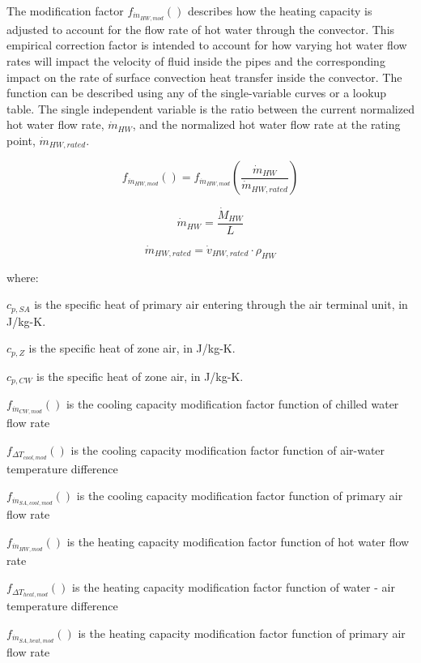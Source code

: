 The modification factor \(f_{\dot m_{HW,mod}}()\) describes how the heating capacity is adjusted to account for the flow rate of hot water through the convector. This empirical correction factor is intended to account for how varying hot water flow rates will impact the velocity of fluid inside the pipes and the corresponding impact on the rate of surface convection heat transfer inside the convector. The function can be described using any of the single-variable curves or a lookup table. The single independent variable is the ratio between the current normalized hot water flow rate, \({\dot m_{HW}}\), and the normalized hot water flow rate at the rating point, \({\dot m_{HW,rated}}\).

\begin{equation}
  f_{\dot m_{HW,mod}}() = f_{\dot m_{HW,mod}}\left(\frac{{\dot m_{HW}}}{{\dot m_{HW,rated}}}\right)
\end{equation}

\begin{equation}
  {\dot m_{HW}} = \frac{\dot M_{HW}}{L}
\end{equation}

\begin{equation}
  {\dot m_{HW,rated}} = {\dot v_{HW,rated}} \cdot {\rho_{HW}}
\end{equation}

where:

\({c_{p,SA}}\) is the specific heat of primary air entering through the air terminal unit, in J/kg-K.

\({c_{p,Z}}\) is the specific heat of zone air, in J/kg-K.

\({c_{p,CW}}\) is the specific heat of zone air, in J/kg-K.

\({f_{\dot m_{CW,mod}}()}\) is the cooling capacity modification factor function of chilled water flow rate

\({f_{ \Delta T_{cool,mod} }()}\) is the cooling capacity modification factor function of air-water temperature difference

\({f_{\dot m_{SA,cool,mod}}()}\) is the cooling capacity modification factor function of primary air flow rate

\({f_{\dot m_{HW,mod}}()}\) is the heating capacity modification factor function of hot water flow rate

\({f_{ \Delta T_{heat,mod} }()}\) is the heating capacity modification factor function of water - air temperature difference

\({f_{\dot m_{SA,heat,mod}}()}\) is the heating capacity modification factor function of primary air flow rate


